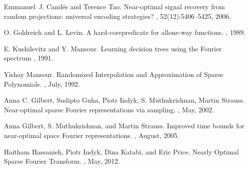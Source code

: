 \documentclass[11pt]{article}
\begin{document}
\begin{thebibliography}{42}

Emmanuel~J. Cand\'{e}s and Terence Tao.
\newblock Near-optimal signal recovery from random projections: universal
encoding strategies?
, 52(12):5406--5425, 2006.

O. Goldreich and L. Levin.
\newblock A hard-corepredicate for allone-way functions.
, 1989.

E. Kushilevitz and Y. Mansour.
\newblock Learning decision trees using the Fourier spectrum
, 1991.

Yishay Mansour.
\newblock Randomized Interpolation and Approximation of Sparse Polynomials.
, July, 1992.

Anna C. Gilbert, Sudipto Guha, Piotr Indyk, S. Muthukrishnan, Martin Strauss.
\newblock Near-optimal sparse Fourier representations via sampling.
, May, 2002.

Anna Gilbert, S. Muthukrishnan, and Martin Strauss.
\newblock Improved time bounds for near-optimal space Fourier representations.
, August, 2005.

Haitham Hassanieh, Piotr Indyk, Dina Katabi, and Eric Price.
\newblock Nearly Optimal Sparse Fourier Transform.
, May, 2012.

\end{thebibliography}
\end{document}

